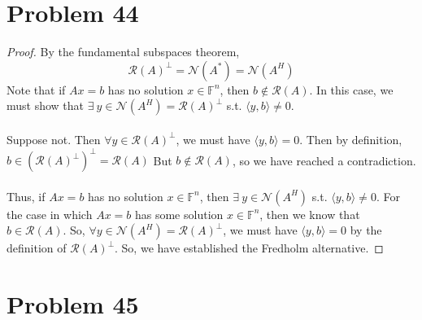 \documentclass{article}
\begin{document}
\section*{Problem 44}

\begin{proof}
By the fundamental subspaces theorem,
$$\mathcal{R}(A)^{\perp} = \mathcal{N}(A^{*}) = \mathcal{N}(A^{H})$$
Note that if $Ax = b$ has no solution $x \in \mathbb{F}^n$, then $b \notin \mathcal{R}(A)$. In this case, we must show that $\exists \ y \in \mathcal{N}(A^{H}) = \mathcal{R}(A)^{\perp}$ s.t. $\langle y, b \rangle \ne 0$. \\
\\
Suppose not. Then $\forall y \in \mathcal{R}(A)^{\perp}$, we must have $\langle y, b \rangle = 0$. Then by definition, $b \in (\mathcal{R}(A)^{\perp})^{\perp} = \mathcal{R}(A)$ But $b \notin \mathcal{R}(A)$, so we have reached a contradiction. \\
\\
Thus, if $Ax = b$ has no solution $x \in \mathbb{F}^n$, then $\exists \ y \in \mathcal{N}(A^{H})$ s.t. $\langle y, b \rangle \ne 0$.
For the case in which $Ax = b$ has some solution $x \in \mathbb{F}^n$, then we know that $b \in \mathcal{R}(A)$. So, $\forall y \in \mathcal{N}(A^{H}) = \mathcal{R}(A)^{\perp}$, we must have $\langle y, b \rangle = 0$ by the definition of $\mathcal{R}(A)^{\perp}$. So, we have established the Fredholm alternative.
\end{proof}

\section*{Problem 45}
\end{document}
